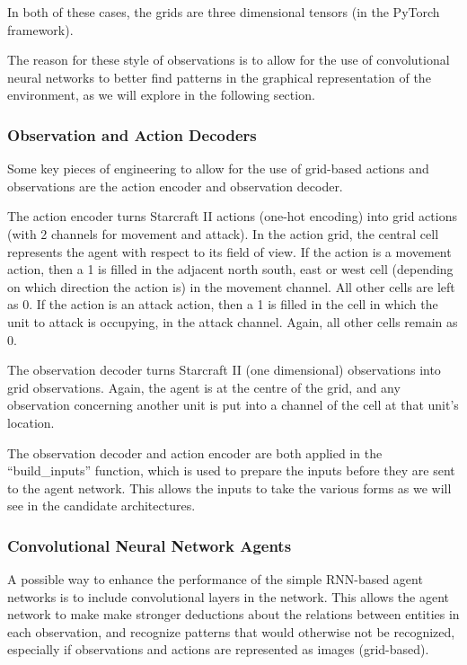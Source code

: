 In both of these cases, the grids are three dimensional tensors (in the PyTorch framework).

The reason for these style of observations is to allow for the use of convolutional neural networks to better find patterns in the graphical representation of the environment, as we will explore in the following section.

\subsubsection{Observation and Action Decoders}

Some key pieces of engineering to allow for the use of grid-based actions and observations are the action encoder and observation decoder. 

The action encoder turns Starcraft II actions (one-hot encoding) into grid actions (with 2 channels for movement and attack). In the action grid, the central cell represents the agent with respect to its field of view. If the action is a movement action, then a 1 is filled in the adjacent north south, east or west cell (depending on which direction the action is) in the movement channel. All other cells are left as 0. If the action is an attack action, then a 1 is filled in the cell in which the unit to attack is occupying, in the attack channel. Again, all other cells remain as 0. 

The observation decoder turns Starcraft II (one dimensional) observations into grid observations. Again, the agent is at the centre of the grid, and any observation concerning another unit is put into a channel of the cell at that unit's location.

The observation decoder and action encoder are both applied in the ``build\_inputs'' function, which is used to prepare the inputs before they are sent to the agent network. This allows the inputs to take the various forms as we will see in the candidate architectures. 

\subsubsection{Convolutional Neural Network Agents}

A possible way to enhance the performance of the simple RNN-based agent networks is to include convolutional layers in the network. This allows the agent network to make make stronger deductions about the relations between entities in each observation, and recognize patterns that would otherwise not be recognized, especially if observations and actions are represented as images (grid-based). 


